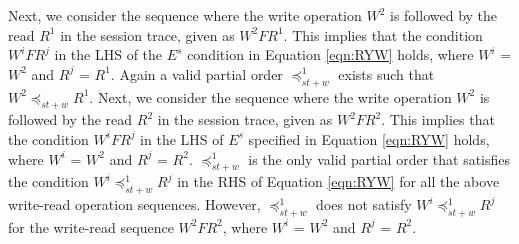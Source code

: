 \documentclass[journal,compsoc]{IEEEtran}
\begin{document}
  Next, we consider the sequence where the write operation $W^2$ is followed by the read $R^1$ in the session trace, given as $W^2 F R^1$.
  This implies that the condition $W^i F R^j$ in the LHS of the $E^{s}$ condition in Equation \ref{eqn:RYW} holds, where $W^i$ = $W^2$ and
  $R^j$ = $R^1$. Again a valid partial order $\preccurlyeq_{\mathit{st}+w}^1$ exists such that $W^2 \preccurlyeq_{\mathit{st}+w} R^1$.
  Next, we consider the sequence where the write operation $W^2$  is followed by the read $R^2$ in the session trace, given as $W^2 F R^2$.
  This implies that the condition $W^i F R^j$ in the LHS of $E^{s}$ specified in Equation \ref{eqn:RYW} holds, where $W^i$ = $W^2$ and
  $R^j$ = $R^2$. $\preccurlyeq_{\mathit{st}+w}^1$ is the only valid partial order that satisfies the condition $W^i \preccurlyeq_{\mathit{st}+w}^1 R^j$
   in the RHS of Equation \ref{eqn:RYW} for all the above write-read operation sequences. However, $\preccurlyeq_{\mathit{st}+w}^1$ does not satisfy
  $W^i \preccurlyeq_{\mathit{st}+w}^1 R^j $ for the write-read sequence $W^2 F R^2$, where $W^i$ = $W^2$ and
  $R^j$ = $R^2$.
\end{document}
